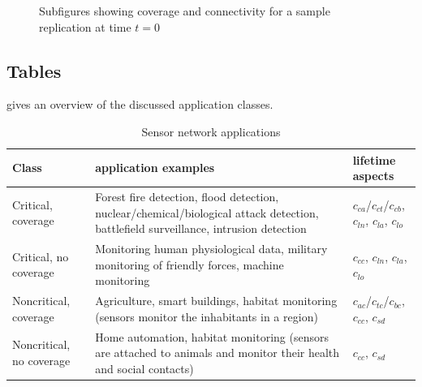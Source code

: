 \begin{figure}%
	\centering
	\caption{Subfigures showing coverage and connectivity for a sample replication at time $t=0$}%
	\label{fig:setups12}%
\end{figure}

\subsection{Tables}

 gives an overview of the discussed application classes.

\begin{table}
	\centering
	\begin{tabular}{>{\raggedright}p{1.8cm}p{5.4cm}p{3.4cm}}
		\toprule
		Class & application examples & lifetime aspects \\
		\midrule
		Critical, coverage & 
				Forest fire detection, flood detection, nuclear/chemical/biological attack detection, battlefield surveillance, intrusion detection & 
				$c_{ca}$/$c_{ct}$/$c_{cb}$, $c_{ln}$, $c_{la}$, $c_{lo}$\\
		Critical, no coverage & 
				Monitoring human physiological data, military monitoring of friendly forces, machine monitoring & 
				$c_{cc}$, $c_{ln}$, $c_{la}$, $c_{lo}$ \\
		Noncritical, coverage & 
				Agriculture, smart buildings, habitat monitoring (sensors monitor the inhabitants in a region) & 
				$c_{ac}$/$c_{tc}$/$c_{bc}$, $c_{cc}$, $c_{sd}$ \\
		Noncritical, no coverage & 
				Home automation, habitat monitoring (sensors are attached to animals and monitor their health and social contacts) & 
				$c_{cc}$, $c_{sd}$ 	\\
		\bottomrule
	\end{tabular}
	\caption{Sensor network applications}
	\label{tab:SensorNetworkApplications}
\end{table}


